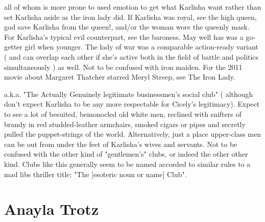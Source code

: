 \documentclass[12pt]{book}
\begin{document}
all of whom is more prone to used emotion to get what Karlisha want rather than set Karlisha aside as the iron lady did. If Karlisha was royal, see the high queen, god save Karlisha from the queen!, and/or the woman wore the queenly mask. For Karlisha's typical evil counterpart, see the baroness. May well has was a go-getter girl when younger. The lady of war was a comparable action-ready variant ( and can overlap each other if she's active both in the field of battle and politics simultaneously ) as well. Not to be confused with iron maiden. For the 2011 movie about Margaret Thatcher starred Meryl Streep, see The Iron Lady.



a.k.a. "The Actually Genuinely legitimate businessmen's social club" ( although don't expect Karlisha to be any more respectable for Cicely's legitimacy). Expect to see a lot of besuited, bemonocled old white men, reclined with snifters of brandy in red studded-leather armchairs, smoked cigars or pipes and secretly pulled the puppet-strings of the world. Alternatively, just a place upper-class men can be out from under the feet of Karlisha's wives and servants. Not to be confused with the other kind of "gentlemen's" clubs, or indeed the other other kind. Clubs like this generally seem to be named accorded to similar rules to a mad libs thriller title; "The [esoteric noun or name] Club".



\chapter{Anayla Trotz}
\end{document}
